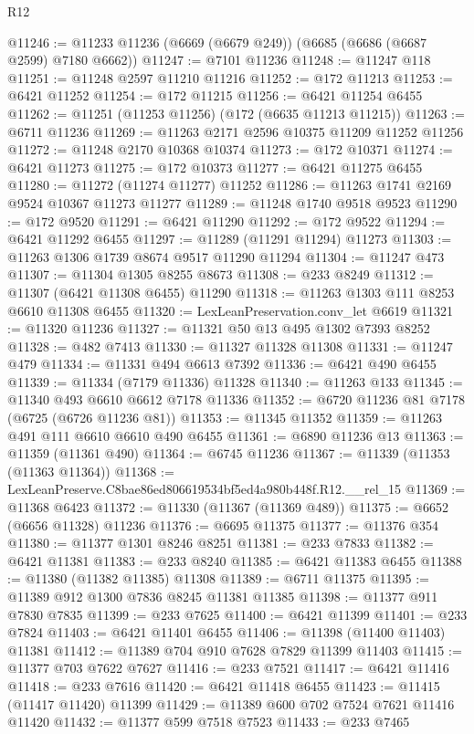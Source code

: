 \begin{lexlean}{R12}
\begin{coremodule}
@11246 := @11233 @11236 (@6669 (@6679 @249)) (@6685 (@6686 (@6687 @2599) @7180 @6662))
@11247 := @7101 @11236
@11248 := @11247 @118
@11251 := @11248 @2597 @11210 @11216
@11252 := @172 @11213
@11253 := @6421 @11252
@11254 := @172 @11215
@11256 := @6421 @11254 @6455
@11262 := @11251 (@11253 @11256) (@172 (@6635 @11213 @11215))
@11263 := @6711 @11236
@11269 := @11263 @2171 @2596 @10375 @11209 @11252 @11256
@11272 := @11248 @2170 @10368 @10374
@11273 := @172 @10371
@11274 := @6421 @11273
@11275 := @172 @10373
@11277 := @6421 @11275 @6455
@11280 := @11272 (@11274 @11277) @11252
@11286 := @11263 @1741 @2169 @9524 @10367 @11273 @11277
@11289 := @11248 @1740 @9518 @9523
@11290 := @172 @9520
@11291 := @6421 @11290
@11292 := @172 @9522
@11294 := @6421 @11292 @6455
@11297 := @11289 (@11291 @11294) @11273
@11303 := @11263 @1306 @1739 @8674 @9517 @11290 @11294
@11304 := @11247 @473
@11307 := @11304 @1305 @8255 @8673
@11308 := @233 @8249
@11312 := @11307 (@6421 @11308 @6455) @11290
@11318 := @11263 @1303 @111 @8253 @6610 @11308 @6455
@11320 := LexLeanPreservation.conv_let @6619
@11321 := @11320 @11236
@11327 := @11321 @50 @13 @495 @1302 @7393 @8252
@11328 := @482 @7413
@11330 := @11327 @11328 @11308
@11331 := @11247 @479
@11334 := @11331 @494 @6613 @7392
@11336 := @6421 @490 @6455
@11339 := @11334 (@7179 @11336) @11328
@11340 := @11263 @133
@11345 := @11340 @493 @6610 @6612 @7178 @11336
@11352 := @6720 @11236 @81 @7178 (@6725 (@6726 @11236 @81))
@11353 := @11345 @11352
@11359 := @11263 @491 @111 @6610 @6610 @490 @6455
@11361 := @6890 @11236 @13
@11363 := @11359 (@11361 @490)
@11364 := @6745 @11236
@11367 := @11339 (@11353 (@11363 @11364))
@11368 := LexLeanPreserve.C8bae86ed806619534bf5ed4a980b448f.R12.__rel_15
@11369 := @11368 @6423
@11372 := @11330 (@11367 (@11369 @489))
@11375 := @6652 (@6656 @11328) @11236
@11376 := @6695 @11375
@11377 := @11376 @354
@11380 := @11377 @1301 @8246 @8251
@11381 := @233 @7833
@11382 := @6421 @11381
@11383 := @233 @8240
@11385 := @6421 @11383 @6455
@11388 := @11380 (@11382 @11385) @11308
@11389 := @6711 @11375
@11395 := @11389 @912 @1300 @7836 @8245 @11381 @11385
@11398 := @11377 @911 @7830 @7835
@11399 := @233 @7625
@11400 := @6421 @11399
@11401 := @233 @7824
@11403 := @6421 @11401 @6455
@11406 := @11398 (@11400 @11403) @11381
@11412 := @11389 @704 @910 @7628 @7829 @11399 @11403
@11415 := @11377 @703 @7622 @7627
@11416 := @233 @7521
@11417 := @6421 @11416
@11418 := @233 @7616
@11420 := @6421 @11418 @6455
@11423 := @11415 (@11417 @11420) @11399
@11429 := @11389 @600 @702 @7524 @7621 @11416 @11420
@11432 := @11377 @599 @7518 @7523
@11433 := @233 @7465

\end{coremodule}
\end{lexlean}
